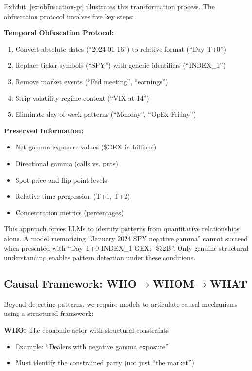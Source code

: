 Exhibit~\ref{ex:obfuscation-jv} illustrates this transformation process. The obfuscation protocol involves five key steps:

\textbf{Temporal Obfuscation Protocol:}
\begin{enumerate}
\item Convert absolute dates (``2024-01-16'') to relative format (``Day T+0'')
\item Replace ticker symbols (``SPY'') with generic identifiers (``INDEX\_1'')
\item Remove market events (``Fed meeting'', ``earnings'')
\item Strip volatility regime context (``VIX at 14'')
\item Eliminate day-of-week patterns (``Monday'', ``OpEx Friday'')
\end{enumerate}

\textbf{Preserved Information:}
\begin{itemize}
\item Net gamma exposure values (\$GEX in billions)
\item Directional gamma (calls vs. puts)
\item Spot price and flip point levels
\item Relative time progression (T+1, T+2)
\item Concentration metrics (percentages)
\end{itemize}

This approach forces LLMs to identify patterns from quantitative relationships alone. A model memorizing ``January 2024 SPY negative gamma'' cannot succeed when presented with ``Day T+0 INDEX\_1 GEX: -\$32B''. Only genuine structural understanding enables pattern detection under these conditions.

\subsection{Causal Framework: \texorpdfstring{WHO$\rightarrow$WHOM$\rightarrow$WHAT}{WHO→WHOM→WHAT}}

Beyond detecting patterns, we require models to articulate causal mechanisms using a structured framework:

\textbf{WHO:} The economic actor with structural constraints
\begin{itemize}
\item Example: ``Dealers with negative gamma exposure''
\item Must identify the constrained party (not just ``the market'')
\end{itemize}

